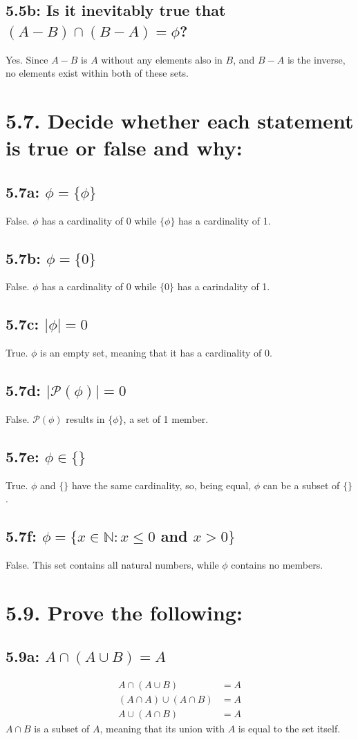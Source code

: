 \documentclass{article}
\begin{document}
\subsection*{5.5b: Is it inevitably true that $(A-B)\cap(B-A)=\phi$?}
Yes. Since $A-B$ is $A$ without any elements also in $B$, and $B-A$ is the inverse, no elements exist within both of these sets.
\section*{5.7. Decide whether each statement is true or false and why:}
\subsection*{5.7a: $\phi=\{\phi\}$}
False. $\phi$ has a cardinality of 0 while $\{\phi\}$ has a cardinality of 1.
\subsection*{5.7b: $\phi=\{0\}$}
False. $\phi$ has a cardinality of 0 while $\{0\}$ has a carindality of 1.
\subsection*{5.7c: $|\phi|=0$}
True. $\phi$ is an empty set, meaning that it has a cardinality of 0.
\subsection*{5.7d: $|\mathcal{P}(\phi)|=0$}
False. $\mathcal{P}(\phi)$ results in $\{\phi\}$, a set of 1 member.
\subsection*{5.7e: $\phi\in\{\}$}
True. $\phi$ and $\{\}$ have the same cardinality, so, being equal, $\phi$ can be a subset of $\{\}$.
\subsection*{5.7f: $\phi=\{x\in\mathbb{N}:x\leq0$ and $x>0\}$}
False. This set contains all natural numbers, while $\phi$ contains no members.
\section*{5.9. Prove the following:}
\subsection*{5.9a: $A\cap(A\cup B)=A$}
\begin{align*}
  A\cap(A\cup B)&=A\\
  (A\cap A)\cup(A\cap B)&=A\\
  A\cup(A\cap B)&=A
\end{align*}
$A\cap B$ is a subset of $A$, meaning that its union with $A$ is equal to the set itself.
\end{document}
